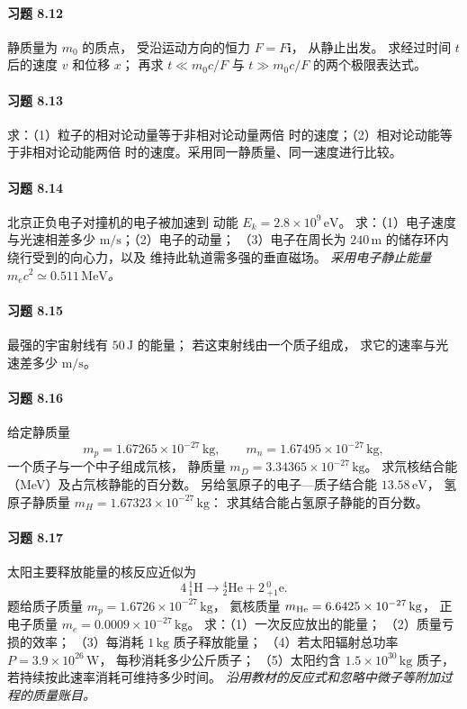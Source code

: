 \paragraph{习题 8.12}
静质量为 \(m_0\) 的质点，
受沿运动方向的恒力 \(F=F\boldsymbol i\)，
从静止出发。
求经过时间 \(t\) 后的速度 \(v\) 和位移 \(x\)；
再求 \(t\ll m_0c/F\) 与
\(t\gg m_0c/F\) 的两个极限表达式。

\paragraph{习题 8.13}
求：（1）粒子的相对论动量等于非相对论动量两倍
时的速度；（2）相对论动能等于非相对论动能两倍
时的速度。采用同一静质量、同一速度进行比较。

\paragraph{习题 8.14}
北京正负电子对撞机的电子被加速到
动能 \(E_k=2.8\times10^9\,\mathrm{eV}\)。
求：（1）电子速度与光速相差多少
\(\mathrm{m/s}\)；（2）电子的动量；
（3）电子在周长为 \(240\,\mathrm m\)
的储存环内绕行受到的向心力，以及
维持此轨道需多强的垂直磁场。
\textit{采用电子静止能量 \(m_ec^2\simeq0.511\,\mathrm{MeV}\)。}

\paragraph{习题 8.15}
最强的宇宙射线有 \(50\,\mathrm J\) 的能量；
若这束射线由一个质子组成，
求它的速率与光速差多少 \(\mathrm{m/s}\)。

\paragraph{习题 8.16}
给定静质量
\[
 m_p=1.67265\times10^{-27}\,\mathrm{kg},\qquad
 m_n=1.67495\times10^{-27}\,\mathrm{kg},
\]
一个质子与一个中子组成氘核，
静质量
\(m_D=3.34365\times10^{-27}\,\mathrm{kg}\)。
求氘核结合能（MeV）及占氘核静能的百分数。
另给氢原子的电子—质子结合能
\(13.58\,\mathrm{eV}\)，
氢原子静质量
\(m_H=1.67323\times10^{-27}\,\mathrm{kg}\)：
求其结合能占氢原子静能的百分数。

\paragraph{习题 8.17}
太阳主要释放能量的核反应近似为
\[
 4\,{}^1_1\mathrm H\longrightarrow
 {}^4_2\mathrm{He}+2\,{}^0_{+1}\mathrm e.
\]
题给质子质量
\(m_p=1.6726\times10^{-27}\,\mathrm{kg}\)，
氦核质量
\(m_{\rm He}=6.6425\times10^{-27}\,\mathrm{kg}\)，
正电子质量
\(m_e=0.0009\times10^{-27}\,\mathrm{kg}\)。
求：（1）一次反应放出的能量；
（2）质量亏损的效率；
（3）每消耗 \(1\,\mathrm{kg}\) 质子释放能量；
（4）若太阳辐射总功率
\(P=3.9\times10^{26}\,\mathrm W\)，
每秒消耗多少公斤质子；
（5）太阳约含
\(1.5\times10^{30}\,\mathrm{kg}\) 质子，
若持续按此速率消耗可维持多少时间。
\textit{沿用教材的反应式和忽略中微子等附加过程的质量账目。}

